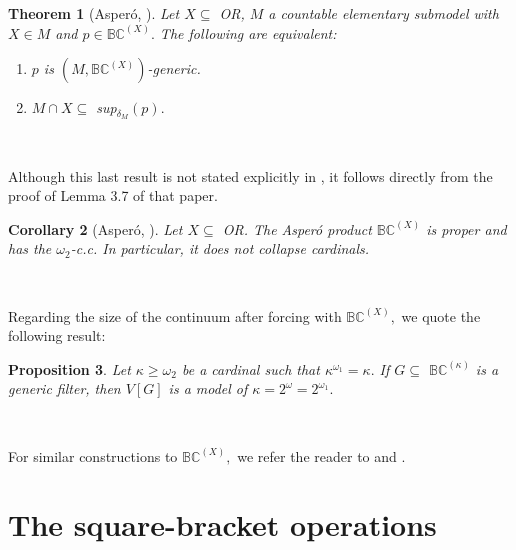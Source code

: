 \documentclass{article}
\newtheorem{theorem}{Theorem}
\newtheorem{corollary}[theorem]{Corollary}
\newtheorem{proposition}[theorem]{Proposition}
\begin{document}
\begin{theorem}
[Asper\'{o}, \cite{AddingBaumgartnerClubs}]Let $X\subseteq$ \textsf{OR}, $M$ a
countable elementary submodel with $X\in M$ and $p\in\mathbb{BC}^{\left(
X\right)  }.$ The following are equivalent: \label{Teo BCX proper}

\begin{enumerate}
\item $p$ is $(M,\mathbb{BC}^{\left(  X\right)  })$-generic.

\item $M\cap X\subseteq$ \textsf{sup}$_{\delta_{M}}\left(  p\right)  .$
\end{enumerate}
\end{theorem}

\qquad\qquad\ \ \ 

Although this last result is not stated explicitly in
\cite{AddingBaumgartnerClubs}, it follows directly from the proof of Lemma 3.7
of that paper.

\begin{corollary}
[Asper\'{o}, \cite{AddingBaumgartnerClubs}]Let $X\subseteq$ \textsf{OR. }The
Asper\'{o} product $\mathbb{BC}^{\left(  X\right)  }$ is proper and has the
$\omega_{2}$-\textsf{c.c. }In particular, it does not collapse cardinals.
\end{corollary}

\qquad\ \qquad\ \ \ \ \ 

Regarding the size of the continuum after forcing with $\mathbb{BC}^{\left(
X\right)  },$ we quote the following result:

\begin{proposition}
Let $\kappa\geq\omega_{2}$ be a cardinal such that $\kappa^{\omega_{1}}%
=\kappa.$ If $G\subseteq$ $\mathbb{BC}^{\left(  \kappa\right)  }$ is a generic
filter, then $V\left[  G\right]  $ is a model of $\kappa=2^{\omega}%
=2^{\omega_{1}}.$ \label{Prop BC tamao continuo}
\end{proposition}

\qquad\ \qquad\ \qquad\qquad\qquad\ \ \ \ \ \ \ \ \ 

For similar constructions to $\mathbb{BC}^{\left(  X\right)  },$ we refer the
reader to \cite{AsperoMota} and \cite{AGeneralizationofMA}.

\section{The square-bracket operations \label{The operations}}
\end{document}
